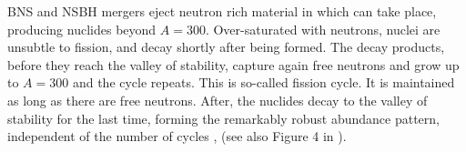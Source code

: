 \ac{BNS} and \ac{NSBH} mergers eject neutron rich material 
in which \rproc{} can take place, producing nuclides beyond $A=300$. Over-saturated with neutrons, 
nuclei are unsubtle to fission, and decay shortly after being formed. The decay products, 
before they reach the valley of stability, capture again free neutrons and grow up to 
$A=300$ and the cycle repeats. 
This is so-called fission cycle. %
It is maintained as long as there are free neutrons. After, the nuclides decay to the valley of 
stability for the last time, forming the remarkably robust abundance pattern, independent of the 
number of cycles \citep{Korobkin:2012uy,Bauswein:2013yna,Mendoza-Temis:2014mja}, 
(see also Figure 4 in \citet{Korobkin:2012uy}).
%


